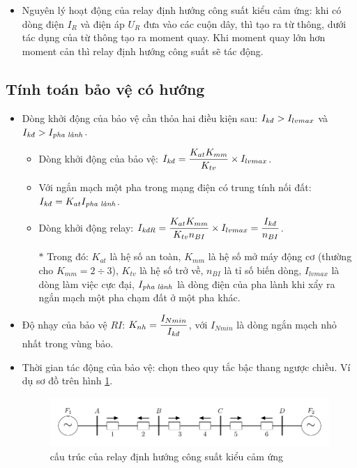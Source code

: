 \documentclass[12pt,a4paper]{article}
\begin{document}
\begin{itemize}
		\item Nguyên lý hoạt động của relay định hướng công suất kiểu cảm ứng: khi có dòng điện $I_R$ và điện áp $U_R$ đưa vào các cuộn dây, thì tạo ra từ thông, dưới tác dụng của từ thông tạo ra moment quay. Khi moment quay lớn hơn moment cản thì relay định hướng công suất sẽ tác động.
	\end{itemize}
	
\subsection{Tính toán bảo vệ có hướng}
	\begin{itemize}
		\item Dòng khởi động của bảo vệ cần thỏa hai điều kiện sau: $I_{\text{\textit{kđ}}} > I_{lvmax}$ và $I_{\text{\textit{kđ}}} > I_{\text{\textit{pha lành}}}$.
			\begin{itemize}
				\item Dòng khởi động của bảo vệ: $I_{\text{\textit{kđ}}} = \dfrac{K_{at} K_{mm}}{K_{tv}} \times I_{lvmax}$.
				
				\item Với ngắn mạch một pha trong mạng điện có trung tính nối đất: $I_{\text{\textit{kđ}}} = K_{at}I_{\text{\textit{pha lành}}}$.								
				
				\item Dòng khởi động relay: $I_{\text{\textit{kđR}}} = \dfrac{K_{at} K_{mm}}{K_{tv} n_{BI}} \times I_{lvmax} = \dfrac{I_{\text{\textit{kđ}}}}{n_{BI}}$.
				
				\item[$\ast$] Trong đó: $K_{at}$ là hệ số an toàn, $K_{mm}$ là hệ số mở máy động cơ (thường cho $K_{mm} = 2 \div 3$), $K_{tv}$ là hệ số trở về, $n_{BI}$ là tỉ số biến dòng, $I_{lvmax}$ là dòng làm việc cực đại, $I_{\text{\textit{pha lành}}}$ là dòng điện của pha lành khi xẩy ra ngắn mạch một pha chạm đất ở một pha khác.	
			\end{itemize}				

		\item Độ nhạy của bảo vệ $RI$: $K_{nh} = \dfrac{I_{Nmin}}{I_{\text{\textit{kđ}}}}$, với $I_{Nmin}$ là dòng ngắn mạch nhỏ nhất trong vùng bảo.
		
		\item Thời gian tác động của bảo vệ: chọn theo quy tắc bậc thang ngược chiều. Ví dụ sơ đồ trên hình \ref{Fig:sodo-baove-dongdiencohuong}.
		
			\begin{figure}[!h]
				\begin{center}					
					\includegraphics[scale=1]{diagram-draw-tikz/Figure-sodo-baove-dongdiencohuong.pdf} 
				\end{center}
				\caption{cấu trúc của relay định hướng công suất kiểu cảm ứng} \label{Fig:sodo-baove-dongdiencohuong}
			\end{figure}
	

\end{itemize}
\end{document}
